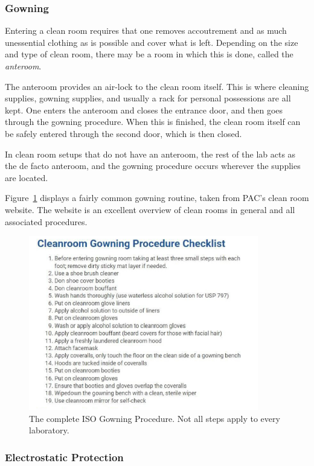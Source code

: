 \documentclass[11pt]{article}
\begin{document}
\subsubsection{Gowning}

Entering a clean room requires that one removes accoutrement and as much unessential clothing as is possible and cover what is left. Depending on the size and type of clean room, there may be a room in which this is done, called the \textit{anteroom}.

The anteroom provides an air-lock to the clean room itself. This is where cleaning supplies, gowning supplies, and usually a rack for personal possessions are all kept. One enters the anteroom and closes the entrance door, and then goes through the gowning procedure. When this is finished, the clean room itself can be safely entered through the second door, which is then closed.

In clean room setups that do not have an anteroom, the rest of the lab acts as the de facto anteroom, and the gowning procedure occurs wherever the supplies are located.

Figure~\ref{fig:gowning} displays a fairly common gowning routine, taken from PAC's clean room website. The website is an excellent overview of clean rooms in general and all associated procedures.~\cite{website:PAC}

\begin{figure}[!b]
    \centering
    \includegraphics[height=3in]{Procedure01.png}
    \caption{The complete ISO Gowning Procedure. Not all steps apply to every laboratory.}
    \label{fig:gowning}
\end{figure}

\subsubsection{Electrostatic Protection}
\end{document}
